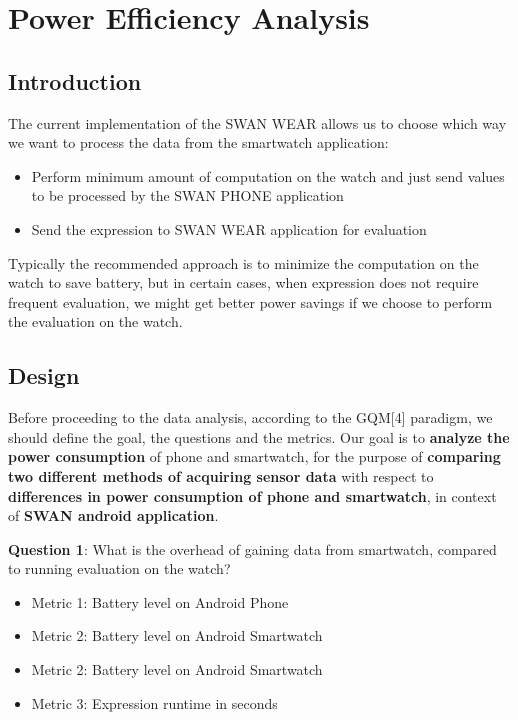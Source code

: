 
\chapter{Power Efficiency Analysis} %

\label{Chapter6} %



\section{Introduction}
The current implementation of the SWAN WEAR allows us to choose which way we want to process the data from the smartwatch application:
\begin{itemize}
 \item Perform minimum amount of computation on the watch and just send values to be processed by the SWAN PHONE application
 \item Send the expression to SWAN WEAR application for evaluation
\end{itemize}

Typically the recommended approach is to minimize the computation on the watch to save battery, but in certain cases,  when expression does not require frequent evaluation, we might get better power savings if we choose to perform the evaluation on the watch.

\section{Design}
Before proceeding to the data analysis, according to the GQM[4] paradigm, we should define the goal, the questions and the metrics.
    Our goal is to \textbf{analyze the power consumption} of phone and smartwatch, for the purpose of \textbf{comparing two different methods of acquiring sensor data}
    with respect to \textbf{differences in power consumption of phone and smartwatch}, in context of \textbf{SWAN android application}.

\textbf{Question 1}: What is the overhead of gaining data from smartwatch, compared to running evaluation on the watch?
\begin{itemize}
  \item Metric 1:  Battery level on Android Phone
  \item Metric 2:  Battery level on Android Smartwatch
  \item Metric 2:  Battery level on Android Smartwatch
  \item  Metric 3:  Expression runtime in seconds
\end{itemize}

